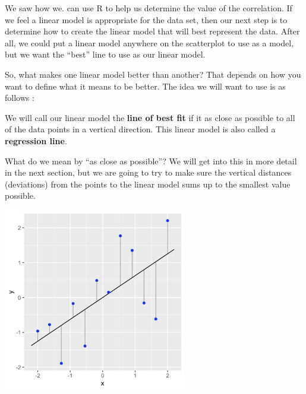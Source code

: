 \documentclass[
  letterpaper,
  DIV=11,
  numbers=noendperiod]{scrreprt}
\begin{document}
We saw how we. can use R to help us determine the value of the
correlation. If we feel a linear model is appropriate for the data set,
then our next step is to determine how to create the linear model that
will best represent the data. After all, we could put a linear model
anywhere on the scatterplot to use as a model, but we want the ``best''
line to use as our linear model.

So, what makes one linear model better than another? That depends on how
you want to define what it means to be better. The idea we will want to
use is as follows :

\begin{tcolorbox}[enhanced jigsaw, opacitybacktitle=0.6, coltitle=black, colframe=quarto-callout-tip-color-frame, colback=white, left=2mm, bottomtitle=1mm, breakable, leftrule=.75mm, arc=.35mm, toptitle=1mm, title=\textcolor{quarto-callout-tip-color}{\faLightbulb}\hspace{0.5em}{Line Of Best Fit}, opacityback=0, rightrule=.15mm, bottomrule=.15mm, titlerule=0mm, toprule=.15mm, colbacktitle=quarto-callout-tip-color!10!white]

We will call our linear model the \textbf{line of best fit} if it as
close as possible to all of the data points in a vertical direction.
This linear model is also called a \textbf{regression line}.

\end{tcolorbox}

What do we mean by ``as close as possible''? We will get into this in
more detail in the next section, but we are going to try to make sure
the vertical distances (deviations) from the points to the linear model
sums up to the smallest value possible.

\includegraphics[width=0.6\textwidth,height=\textheight]{./images/LMR_2.jpg}
\end{document}
